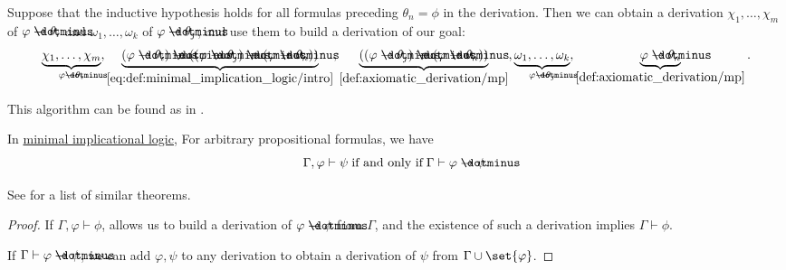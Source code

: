 \begin{algorithm}
\begin{thmenum}
    Suppose that the inductive hypothesis holds for all formulas preceding \( \theta_n = \phi \) in the derivation. Then we can obtain a derivation \( \chi_1, \ldots, \chi_m \) of \( \varphi \synimplies \theta_i \) and \( \omega_1, \ldots, \omega_k \) of \( \varphi \synimplies \theta_j \), and use them to build a derivation of our goal:
    \small
    \begin{equation*}
      \underbrace{\chi_1, \ldots, \chi_m}_{\varphi \synimplies \theta_i},
      \underbrace{(\varphi \synimplies \theta_i) \synimplies ((\varphi \synimplies \theta_j) \synimplies (\varphi \synimplies \theta_n))}_{\eqref{eq:def:minimal_implication_logic/intro}},
      \underbrace{((\varphi \synimplies \theta_j) \synimplies (\varphi \synimplies \theta_n))}_{\ref{def:axiomatic_derivation/mp}},
      \underbrace{\omega_1, \ldots, \omega_k}_{\varphi \synimplies \theta_j},
      \underbrace{\varphi \synimplies \theta_n}_{\ref{def:axiomatic_derivation/mp}}.
    \end{equation*}
    \normalsize
  \end{thmenum}
\end{algorithm}
\begin{comments}
  \item This algorithm can be found as  in \cite{code}.
\end{comments}

\begin{theorem}\label{thm:implicational_syntactic_deduction_theorem}
  In \hyperref[def:minimal_implication_logic]{minimal implicational logic}, For arbitrary propositional formulas, we have
  \begin{equation*}
    \Gamma, \varphi \vdash \psi \T{if and only if} \Gamma \vdash \varphi \synimplies \psi.
  \end{equation*}
\end{theorem}
\begin{comments}
  \item See  for a list of similar theorems.
\end{comments}
\begin{proof}
  \SufficiencySubProof If \( \Gamma, \varphi \vdash \phi \),  allows us to build a derivation of \( \varphi \synimplies \phi \) from \( \Gamma \), and the existence of such a derivation implies \( \Gamma \vdash \phi \).

  \NecessitySubProof If \( \Gamma \vdash \varphi \synimplies \psi \), we can add \( \varphi, \psi \) to any derivation to obtain a derivation of \( \psi \) from \( \Gamma \cup \set{ \varphi } \).
\end{proof}

